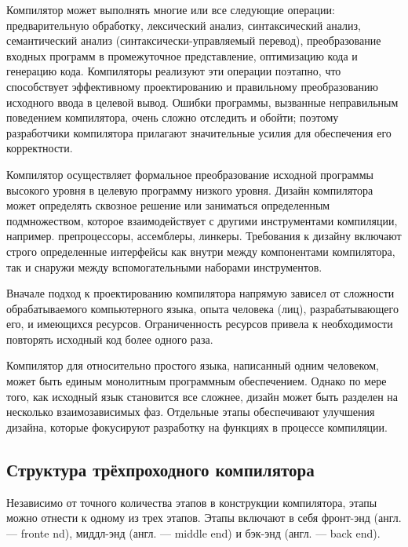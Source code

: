 Компилятор может выполнять многие или все следующие операции: предварительную обработку, лексический анализ, синтаксический анализ, семантический анализ (синтаксически-управляемый перевод), преобразование входных программ в промежуточное представление, оптимизацию кода и генерацию кода. Компиляторы реализуют эти операции поэтапно, что способствует эффективному проектированию и правильному преобразованию исходного ввода в целевой вывод. Ошибки программы, вызванные неправильным поведением компилятора, очень сложно отследить и обойти; поэтому разработчики компилятора прилагают значительные усилия для обеспечения его корректности.

Компилятор осуществляет формальное преобразование исходной программы высокого уровня в целевую программу низкого уровня. Дизайн компилятора может определять сквозное решение или заниматься определенным подмножеством, которое взаимодействует с другими инструментами компиляции, например. препроцессоры, ассемблеры, линкеры. Требования к дизайну включают строго определенные интерфейсы как внутри между компонентами компилятора, так и снаружи между вспомогательными наборами инструментов.

Вначале подход к проектированию компилятора напрямую зависел от сложности обрабатываемого компьютерного языка, опыта человека (лиц), разрабатывающего его, и имеющихся ресурсов. Ограниченность ресурсов привела к необходимости повторять исходный код более одного раза.

Компилятор для относительно простого языка, написанный одним человеком, может быть единым монолитным программным обеспечением. Однако по мере того, как исходный язык становится все сложнее, дизайн может быть разделен на несколько взаимозависимых фаз. Отдельные этапы обеспечивают улучшения дизайна, которые фокусируют разработку на функциях в процессе компиляции. 

\subsection{Структура трёхпроходного компилятора}\label{sec:ch1/sec5/subsec1}

Независимо от точного количества этапов в конструкции компилятора, этапы можно отнести к одному из трех этапов. Этапы включают в себя фронт-энд (англ. --- fronte nd), миддл-энд (англ. --- middle end) и бэк-энд (англ. --- back end).

